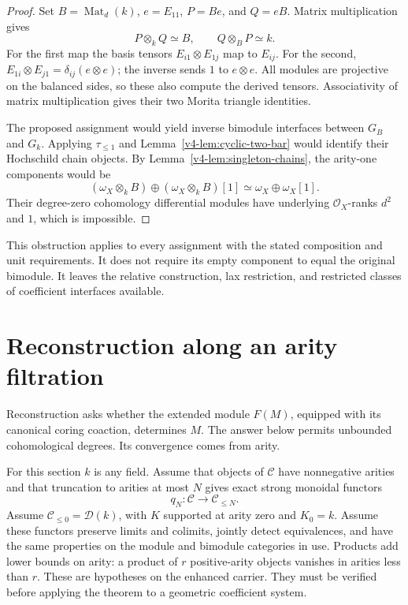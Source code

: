 \begin{proof}
Set \(B=\operatorname{Mat}_d(k)\), \(e=E_{11}\),
\(P=Be\), and \(Q=eB\).
Matrix multiplication gives
\[
 P\otimes_k Q\simeq B,\qquad Q\otimes_B P\simeq k.
\]
For the first map the basis tensors
\(E_{i1}\otimes E_{1j}\) map to \(E_{ij}\).
For the second,
\(E_{1i}\otimes E_{j1}=\delta_{ij}(e\otimes e)\);
the inverse sends \(1\) to \(e\otimes e\).
All modules are projective on the balanced sides, so these also
compute the derived tensors. Associativity of matrix multiplication
gives their two Morita triangle identities.

The proposed assignment would yield inverse bimodule interfaces
between \(G_B\) and \(G_k\). Applying \(\tau_{\leq1}\) and
Lemma~\ref{v4-lem:cyclic-two-bar} would identify their Hochschild
chain objects. By Lemma~\ref{v4-lem:singleton-chains}, the arity-one
components would be
\[
 (\omega_X\otimes_k B)\oplus(\omega_X\otimes_k B)[1]
 \simeq \omega_X\oplus\omega_X[1].
\]
Their degree-zero cohomology differential modules have underlying
\(\mathcal O_X\)-ranks \(d^2\) and \(1\), which is impossible.
\end{proof}

This obstruction applies to every assignment with the stated
composition and unit requirements. It does not require its empty
component to equal the original bimodule.
It leaves the relative construction, lax restriction, and
restricted classes of coefficient interfaces available.

\section{Reconstruction along an arity filtration}
\label{v4-sec:arity-reconstruction}

Reconstruction asks whether the extended module
\(F(M)\), equipped with its canonical coring coaction, determines \(M\).
The answer below permits unbounded cohomological degrees. Its
convergence comes from arity.

For this section \(k\) is any field.
Assume that objects of \(\mathcal C\) have nonnegative arities and
that truncation to arities at most \(N\) gives exact strong monoidal
functors
\[
 q_N:\mathcal C\longrightarrow\mathcal C_{\leq N}.
\]
Assume \(\mathcal C_{\leq0}=\mathcal D(k)\), with \(K\) supported
at arity zero and \(K_0=k\).
Assume these functors preserve limits and colimits, jointly detect
equivalences, and have the same properties on the module and
bimodule categories in use. Products add lower bounds on arity:
a product of \(r\) positive-arity objects vanishes in arities
less than \(r\).
These are hypotheses on the enhanced carrier. They must be
verified before applying the theorem to a geometric coefficient
system.

